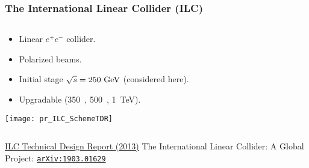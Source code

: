 \begin{frame}
    \frametitle{The International Linear Collider (ILC)}
    \begin{columns}[c,onlytextwidth]
    \begin{column}{0.60\textwidth}
        \begin{itemize}
            \item Linear $e^+e^-$ collider.
            \item Polarized beams.
            \item Initial stage $\sqrt{s} = 250~\text{G\text{e\kern-0.15ex V}}$ (considered here).
            \item Upgradable (350~\GeV, 500~\GeV, 1~TeV).
        \end{itemize}
        \texttt{[image: pr\_ILC\_SchemeTDR]}
    \end{column}
    \begin{column}{0.40\textwidth}
    \end{column}
    \end{columns}
    \vfill
    {\footnotesize
    \href{https://linearcollider.org/technical-design-report/}{ILC Technical Design Report (2013)}\newline
    The International Linear Collider: A Global Project:
    \href{https://arxiv.org/abs/1903.01629}{\color{llblue}\texttt{arXiv:1903.01629}}
    }
    \end{frame}
